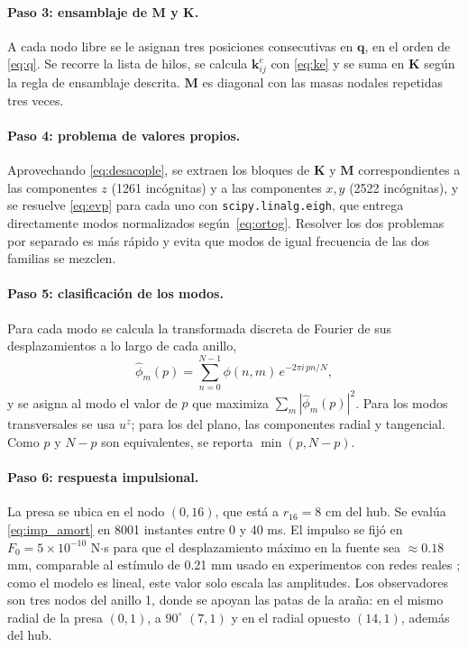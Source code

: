 \documentclass[11pt,letterpaper]{article}
\begin{document}
\paragraph{Paso 3: ensamblaje de $\mathbf{M}$ y $\mathbf{K}$.} A cada nodo
libre se le asignan tres posiciones consecutivas en $\mathbf{q}$, en el orden
de \eqref{eq:q}. Se recorre la lista de hilos, se calcula $\mathbf{k}^e_{ij}$
con \eqref{eq:ke} y se suma en $\mathbf{K}$ según la regla de ensamblaje
descrita. $\mathbf{M}$ es diagonal con las masas nodales repetidas tres
veces.

\paragraph{Paso 4: problema de valores propios.} Aprovechando
\eqref{eq:desacople}, se extraen los bloques de $\mathbf{K}$ y $\mathbf{M}$
correspondientes a las componentes $z$ (1261 incógnitas) y a las componentes
$x,y$ (2522 incógnitas), y se resuelve \eqref{eq:evp} para cada uno con
\texttt{scipy.linalg.eigh}, que entrega directamente modos normalizados
según~\eqref{eq:ortog}. Resolver los dos problemas por separado es más
rápido y evita que modos de igual frecuencia de las dos familias se mezclen.

\paragraph{Paso 5: clasificación de los modos.} Para cada modo se calcula la
transformada discreta de Fourier de sus desplazamientos a lo largo de cada
anillo,
\begin{equation}
    \hat{\phi}_{m}(p)=\sum_{n=0}^{N-1}\phi(n,m)\,e^{-2\pi i\,pn/N},
\end{equation}
y se asigna al modo el valor de $p$ que maximiza
$\sum_m|\hat{\phi}_m(p)|^2$. Para los modos transversales se usa $u^z$; para
los del plano, las componentes radial y tangencial. Como $p$ y $N-p$ son
equivalentes, se reporta $\min(p,N-p)$.

\paragraph{Paso 6: respuesta impulsional.} La presa se ubica en el nodo
$(0,16)$, que está a $r_{16}=8$ cm del hub. Se evalúa
\eqref{eq:imp_amort} en 8001 instantes entre 0 y 40 ms. El impulso se fijó en
$F_0=5\times10^{-10}$ N$\cdot$s para que el desplazamiento máximo en la
fuente sea $\approx0.18$ mm, comparable al estímulo de 0.21 mm usado en
experimentos con redes reales \cite{mortimer2018}; como el modelo es lineal,
este valor solo escala las amplitudes. Los observadores son tres nodos del
anillo 1, donde se apoyan las patas de la araña: en el mismo radial de la
presa $(0,1)$, a $90^\circ$ $(7,1)$ y en el radial opuesto $(14,1)$, además
del hub.
\end{document}
